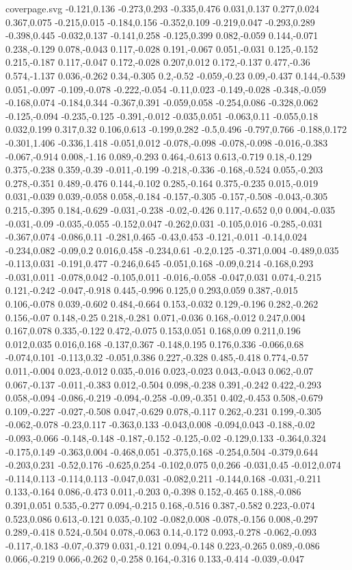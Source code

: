 \begin{filecontents}[noheader]{coverpage.svg}
-0.121,0.136 -0.273,0.293 -0.335,0.476 0.031,0.137 0.277,0.024 0.367,0.075 -0.215,0.015 -0.184,0.156 -0.352,0.109 -0.219,0.047 -0.293,0.289 -0.398,0.445 -0.032,0.137 -0.141,0.258 -0.125,0.399 0.082,-0.059 0.144,-0.071 0.238,-0.129 0.078,-0.043 0.117,-0.028 0.191,-0.067 0.051,-0.031 0.125,-0.152 0.215,-0.187 0.117,-0.047 0.172,-0.028 0.207,0.012 0.172,-0.137 0.477,-0.36 0.574,-1.137 0.036,-0.262 0.34,-0.305 0.2,-0.52 -0.059,-0.23 0.09,-0.437 0.144,-0.539 0.051,-0.097 -0.109,-0.078 -0.222,-0.054 -0.11,0.023 -0.149,-0.028 -0.348,-0.059 -0.168,0.074 -0.184,0.344 -0.367,0.391 -0.059,0.058 -0.254,0.086 -0.328,0.062 -0.125,-0.094 -0.235,-0.125 -0.391,-0.012 -0.035,0.051 -0.063,0.11 -0.055,0.18 0.032,0.199 0.317,0.32 0.106,0.613 -0.199,0.282 -0.5,0.496 -0.797,0.766 -0.188,0.172 -0.301,1.406 -0.336,1.418 -0.051,0.012 -0.078,-0.098 -0.078,-0.098 -0.016,-0.383 -0.067,-0.914 0.008,-1.16 0.089,-0.293 0.464,-0.613 0.613,-0.719 0.18,-0.129 0.375,-0.238 0.359,-0.39 -0.011,-0.199 -0.218,-0.336 -0.168,-0.524 0.055,-0.203 0.278,-0.351 0.489,-0.476 0.144,-0.102 0.285,-0.164 0.375,-0.235 0.015,-0.019 0.031,-0.039 0.039,-0.058 0.058,-0.184 -0.157,-0.305 -0.157,-0.508 -0.043,-0.305 0.215,-0.395 0.184,-0.629 -0.031,-0.238 -0.02,-0.426 0.117,-0.652 0,0 0.004,-0.035 -0.031,-0.09 -0.035,-0.055 -0.152,0.047 -0.262,0.031 -0.105,0.016 -0.285,-0.031 -0.367,0.074 -0.086,0.11 -0.281,0.465 -0.43,0.453 -0.121,-0.011 -0.14,0.024 -0.234,0.082 -0.09,0.2 0.016,0.458 -0.234,0.61 -0.2,0.125 -0.371,0.004 -0.489,0.035 -0.113,0.031 -0.191,0.477 -0.246,0.645 -0.051,0.168 -0.09,0.214 -0.168,0.293 -0.031,0.011 -0.078,0.042 -0.105,0.011 -0.016,-0.058 -0.047,0.031 0.074,-0.215 0.121,-0.242 -0.047,-0.918 0.445,-0.996 0.125,0 0.293,0.059 0.387,-0.015 0.106,-0.078 0.039,-0.602 0.484,-0.664 0.153,-0.032 0.129,-0.196 0.282,-0.262 0.156,-0.07 0.148,-0.25 0.218,-0.281 0.071,-0.036 0.168,-0.012 0.247,0.004 0.167,0.078 0.335,-0.122 0.472,-0.075 0.153,0.051 0.168,0.09 0.211,0.196 0.012,0.035 0.016,0.168 -0.137,0.367 -0.148,0.195 0.176,0.336 -0.066,0.68 -0.074,0.101 -0.113,0.32 -0.051,0.386 0.227,-0.328 0.485,-0.418 0.774,-0.57 0.011,-0.004 0.023,-0.012 0.035,-0.016 0.023,-0.023 0.043,-0.043 0.062,-0.07 0.067,-0.137 -0.011,-0.383 0.012,-0.504 0.098,-0.238 0.391,-0.242 0.422,-0.293 0.058,-0.094 -0.086,-0.219 -0.094,-0.258 -0.09,-0.351 0.402,-0.453 0.508,-0.679 0.109,-0.227 -0.027,-0.508 0.047,-0.629 0.078,-0.117 0.262,-0.231 0.199,-0.305 -0.062,-0.078 -0.23,0.117 -0.363,0.133 -0.043,0.008 -0.094,0.043 -0.188,-0.02 -0.093,-0.066 -0.148,-0.148 -0.187,-0.152 -0.125,-0.02 -0.129,0.133 -0.364,0.324 -0.175,0.149 -0.363,0.004 -0.468,0.051 -0.375,0.168 -0.254,0.504 -0.379,0.644 -0.203,0.231 -0.52,0.176 -0.625,0.254 -0.102,0.075 0,0.266 -0.031,0.45 -0.012,0.074 -0.114,0.113 -0.114,0.113 -0.047,0.031 -0.082,0.211 -0.144,0.168 -0.031,-0.211 0.133,-0.164 0.086,-0.473 0.011,-0.203 0,-0.398 0.152,-0.465 0.188,-0.086 0.391,0.051 0.535,-0.277 0.094,-0.215 0.168,-0.516 0.387,-0.582 0.223,-0.074 0.523,0.086 0.613,-0.121 0.035,-0.102 -0.082,0.008 -0.078,-0.156 0.008,-0.297 0.289,-0.418 0.524,-0.504 0.078,-0.063 0.14,-0.172 0.093,-0.278 -0.062,-0.093 -0.117,-0.183 -0.07,-0.379 0.031,-0.121 0.094,-0.148 0.223,-0.265 0.089,-0.086 0.066,-0.219 0.066,-0.262 0,-0.258 0.164,-0.316 0.133,-0.414 -0.039,-0.047 
\end{filecontents}
